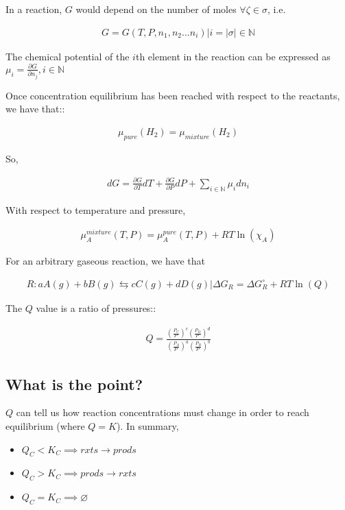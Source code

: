 \documentclass[12pt]{book}
\begin{document}
In a reaction, $G$ would depend on the number of moles $\forall \zeta\in \sigma$, i.e.

\begin{align*}
    G=G(T,P,n_1,n_2\ldots n_i)|i=|\sigma|\in \mathbb{N}
\end{align*}

The chemical potential of the $i$th element in the reaction can be expressed as $\mu_i=\frac{\partial G}{\partial n_j}, i\in \mathbb{N}$

Once concentration equilibrium has been reached with respect to the reactants, we have that::

\begin{align*}
    \mu_{pure}(H_2)=\mu_{mixture}(H_2)
\end{align*}

So,

\begin{align*}
    dG=\frac{\partial G}{\partial T}dT+\frac{\partial G}{\partial P}dP+\sum_{i\in \mathbb{N}} \mu_i dn_i
\end{align*}

With respect to temperature and pressure,

\begin{align*}
    \mu_A^{mixture}(T,P)=\mu_A^{pure}(T,P)+RT\ln(\chi_A)
\end{align*}

For an arbitrary gaseous reaction, we have that

\begin{align*}
    R:aA(g)+ bB(g)\leftrightarrows cC(g)+dD(g)|\Delta G_R=\Delta G_R^{\circ}+RT\ln(Q)
\end{align*}

The $Q$ value is a ratio of pressures::

\begin{align*}
    Q=\frac{\left(\frac{P_C}{P^{\circ}}\right)^c\left(\frac{P_D}{P^{\circ}}\right)^d}{\left(\frac{P_A}{P^{\circ}}\right)^a\left(\frac{P_B}{P^{\circ}}\right)^b}
\end{align*}

\subsection*{What is the point?}

$Q$ can tell us how reaction concentrations must change in order to reach equilibrium (where $Q=K$). In summary,

\begin{itemize}
    \item $Q_C<K_C\implies rxts\rightarrow prods$
    \item $Q_C>K_C\implies prods\rightarrow rxts$
    \item $Q_C=K_C\implies \varnothing$
\end{itemize}
\end{document}
